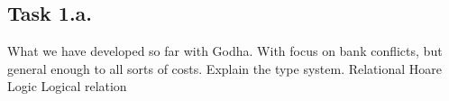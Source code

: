 \subsection{Task 1.a.} What we have developed so far with Godha.
With focus on bank conflicts, but general enough to all sorts of costs.
Explain the type system.
Relational Hoare Logic
Logical relation
